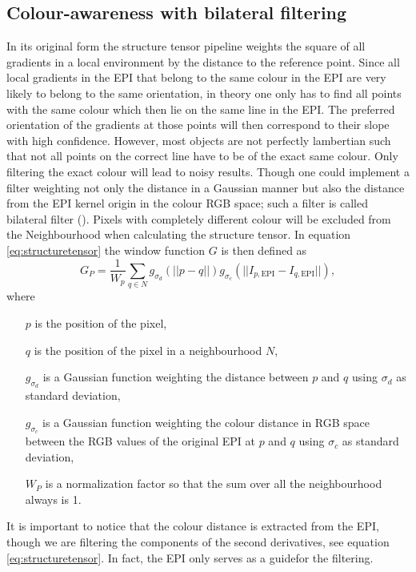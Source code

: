 \documentclass  [
  paper    = a4,
  BCOR     = 10mm,
  twoside,
  fontsize = 12pt,
  fleqn,
  toc      = bibnumbered,
  toc      = listofnumbered,
  numbers  = noendperiod,
  headings = normal,
  listof   = leveldown,
  version  = 3.03
]                                       {scrreprt}
\begin{document}
 \subsection{Colour-awareness with bilateral filtering}
 \label{sec:bilateral}
 In its original form the structure tensor pipeline weights the square of all gradients in a local environment by the distance to the reference point. Since all local gradients in the EPI that belong to the same colour in the EPI are very likely to belong to the same orientation, in theory one only has to find all points with the same colour which then lie on the same line in the EPI. The preferred orientation of the gradients at those points will then correspond to their slope with high confidence. However, most objects are not perfectly lambertian such that not all points on the correct line have to be of the exact same colour. Only filtering the exact colour will lead to noisy results. Though one could implement a filter weighting not only the distance in a Gaussian manner but also the distance from the  EPI kernel origin in the colour RGB space; such a filter is called \glqq bilateral filter \grqq (\cite{tomasi1998bilateral}). Pixels with completely different colour will be excluded from the Neighbourhood when calculating the structure tensor. In equation \ref{eq:structuretensor} the window function $G$ is then defined as 
 \begin{equation}\label{eq:bilateral}
 G_P = \frac{1}{W_p}\sum_{q\in N} g_{\sigma_d}(||p-q||) g_{\sigma_c}(||I_{p, \text{EPI}}-I_{q, \text{EPI}}||),
 \end{equation}
 where
 \begin{itemize}
 	\item[$p$] is the position of the pixel,
 	\item[$q$] is the position of the pixel in a neighbourhood $N$,
 	\item[ $g_{\sigma_d}$] is a Gaussian function weighting the distance between $p$ and $q$ using $\sigma_d$ as standard deviation,
 	\item[ $g_{\sigma_c}$] is a Gaussian function weighting the colour distance in RGB space between the  RGB values of the original EPI at $p$ and $q$ using $\sigma_c$ as standard deviation,
 	\item[$W_P$] is a normalization factor so that the sum over all the neighbourhood always is 1. 
 \end{itemize}


It is important to notice that the colour distance is extracted from the EPI, though we are filtering the components of the second derivatives, see equation \ref{eq:structuretensor}. In fact, the EPI only serves as a \glqq guide\grqq for the filtering.
\end{document}
